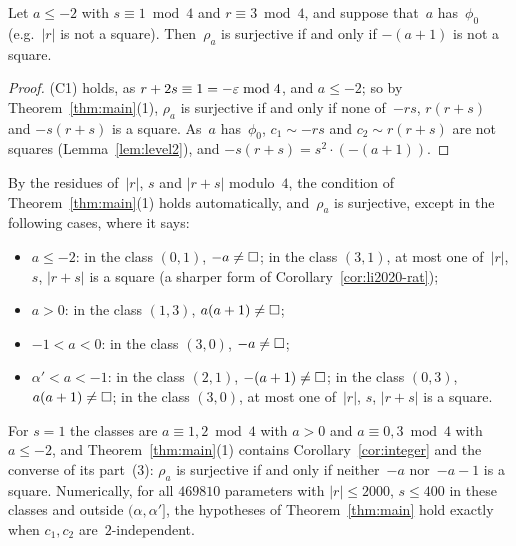 \begin{corollary}
  \label{cor:li2020-rat}
  \leanok
  Let $a \le -2$ with $s \equiv 1 \bmod 4$ and $r \equiv 3 \bmod 4$, and suppose that~$a$
  has~$\phi_0$ (e.g.\ $|r|$ is not a square). Then~$\rho_a$ is surjective if and only if $-(a + 1)$
  is not a square.
\end{corollary}
\begin{proof}
  \leanok
  (C1) holds, as $r + 2s \equiv 1 = -\varepsilon \bmod 4$, and $a \le -2$; so by
  Theorem~\ref{thm:main}(1), $\rho_a$ is surjective if and only if none of~$-rs$, $r(r + s)$ and
  $-s(r + s)$ is a square. As~$a$ has~$\phi_0$, $c_1 \sim -rs$ and $c_2 \sim r(r + s)$ are not
  squares (Lemma~\ref{lem:level2}), and $-s(r + s) = s^2 \cdot (-(a + 1))$.
\end{proof}

\begin{remark}
  \label{rem:level2-classes}
  By the residues of~$|r|$, $s$ and $|r + s|$ modulo~$4$, the condition of
  Theorem~\ref{thm:main}(1) holds automatically, and~$\rho_a$ is surjective, except in the
  following cases, where it says:
  \begin{itemize}
    \item $a \le -2$: in the class $(0,1)$, $-a \ne \square$; in the class $(3,1)$, at most one
          of~$|r|$, $s$, $|r + s|$ is a square (a sharper form of Corollary~\ref{cor:li2020-rat});
    \item $a > 0$: in the class $(1,3)$, $a(a+1) \ne \square$;
    \item $-1 < a < 0$: in the class $(3,0)$, $-a \ne \square$;
    \item $\alpha' < a < -1$: in the class $(2,1)$, $-(a+1) \ne \square$; in the class $(0,3)$,
          $a(a+1) \ne \square$; in the class $(3,0)$, at most one of~$|r|$, $s$, $|r + s|$ is a square.
  \end{itemize}
  For $s = 1$ the classes are $a \equiv 1, 2 \bmod 4$ with $a > 0$ and $a \equiv 0, 3 \bmod 4$
  with $a \le -2$, and Theorem~\ref{thm:main}(1) contains Corollary~\ref{cor:integer} and the
  converse of its part~(3): $\rho_a$ is surjective if and only if neither~$-a$ nor~$-a - 1$ is a
  square. Numerically, for all $469810$ parameters with $|r| \le 2000$, $s \le 400$ in these
  classes and outside $(\alpha, \alpha']$, the hypotheses of Theorem~\ref{thm:main} hold exactly
  when $c_1, c_2$ are~$2$-independent.
\end{remark}

